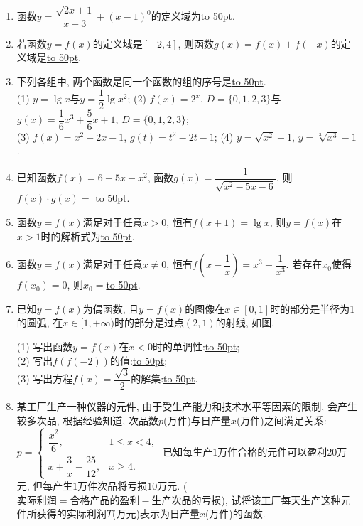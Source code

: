 \documentclass[10pt,a4paper]{article}
\newcommand{\blank}[1]{\underline{\hbox to #1pt{}}}
\begin{document}
\begin{enumerate}[1.]
\item 函数$y=\dfrac{\sqrt{2x+1}}{x-3}+(x-1)^0$的定义域为\blank{50}.
\item 若函数$y=f(x)$的定义域是$[-2,4]$, 则函数$g(x)=f(x)+f(-x)$的定义域是\blank{50}.
\item 下列各组中, 两个函数是同一个函数的组的序号是\blank{50}.\\
(1) $y=\lg x$与$y=\dfrac 12\lg {x^2}$; (2) $f(x)=2^x$, $D=\{0,1,2,3\}$与$g(x)=\dfrac 16{x^3}+\dfrac 56x+1$, $D=\{0,1,2,3\}$; \\
(3) $f(x)=x^2-2x-1$, $g(t)=t^2-2t-1$; (4) $y=\sqrt{x^2}-1$, $y=\sqrt[3]{x^3}-1$.
\item 已知函数$f(x)=6+5x-x^2$, 函数$g(x)=\dfrac {1}{\sqrt{x^2-5x-6}}$, 则$f(x)\cdot g(x)=$	\blank{50}.
\item 函数$y=f(x)$满足对于任意$x>0$, 恒有$f(x+1)=\lg x$, 则$y=f(x)$在$x>1$时的解析式为\blank{50}.
\item 函数$y=f(x)$满足对于任意$x\ne 0$, 恒有$f(x-\dfrac 1x)=x^3-\dfrac 1{x^3}$. 若存在$x_0$使得$f(x_0)=0$, 则$x_0=$\blank{50}.
\item 已知$y=f(x)$为偶函数, 且$y=f(x)$的图像在$x\in [0,1]$时的部分是半径为1的圆弧, 在$x\in [1,+\infty)$时的部分是过点$(2,1)$的射线, 如图.\\
\begin{center}
\end{center}
(1) 写出函数$y=f(x)$在$x<0$时的单调性:\blank{50};\\
(2) 写出$f(f(-2))$的值:\blank{50};\\
(3) 写出方程$f(x)=\dfrac{\sqrt 3}2$的解集:\blank{50}.
\item 某工厂生产一种仪器的元件, 由于受生产能力和技术水平等因素的限制, 会产生较多次品, 根据经验知道, 次品数$p$(万件)与日产量$x$(万件)之间满足关系: $p=\begin{cases}  \dfrac{x^2}6,  &1\le x<4, \\ x+\dfrac 3x-\dfrac{25}{12}, & x\ge 4. \end{cases}$ 已知每生产$1$万件合格的元件可以盈利$20$万元, 但每产生$1$万件次品将亏损$10$万元. ($\text{实际利润}=\text{合格产品的盈利}-\text{生产次品的亏损}$), 试将该工厂每天生产这种元件所获得的实际利润$T$(万元)表示为日产量$x$(万件)的函数.

\end{enumerate}
\end{document}
